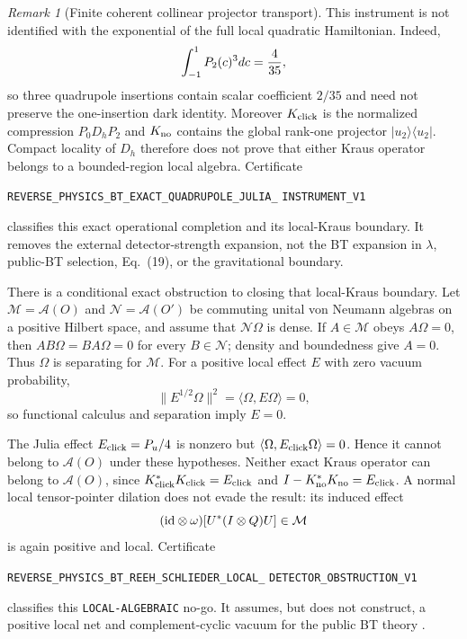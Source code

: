 \documentclass[11pt]{article}
\theoremstyle{definition}
\theoremstyle{remark}
\newtheorem{remark}[theorem]{Remark}
\begin{document}
\begin{remark}[Finite coherent collinear projector transport]
This instrument is not identified with the exponential of the full local
quadratic Hamiltonian.  Indeed,
\[
 \int_{-1}^{1}P_2(c)^3dc={4\over35},
\]
so three quadrupole insertions contain scalar coefficient $2/35$ and need not
preserve the one-insertion dark identity.  Moreover
$K_{\rm click}$ is the normalized compression $P_0D_hP_2$ and
$K_{\rm no}$ contains the global rank-one projector
$|u_2\rangle\langle u_2|$.  Compact locality of $D_h$ therefore does not prove
that either Kraus operator belongs to a bounded-region local algebra.
Certificate
\par\noindent
\texttt{REVERSE\_PHYSICS\_BT\_EXACT\_QUADRUPOLE\_JULIA\_}
\allowbreak\texttt{INSTRUMENT\_V1}
\par\noindent
classifies this exact operational completion and its local-Kraus boundary.
It removes the external detector-strength expansion, not the BT expansion in
$\lambda$, public-BT selection, Eq.~(19), or the gravitational boundary.

There is a conditional exact obstruction to closing that local-Kraus
boundary.  Let $\mathcal M=\mathcal A(O)$ and
$\mathcal N=\mathcal A(O')$ be commuting unital von Neumann algebras on a
positive Hilbert space, and assume that $\mathcal N\Omega$ is dense.  If
$A\in\mathcal M$ obeys $A\Omega=0$, then
$AB\Omega=BA\Omega=0$ for every $B\in\mathcal N$; density and boundedness
give $A=0$.  Thus $\Omega$ is separating for $\mathcal M$.  For a positive
local effect $E$ with zero vacuum probability,
\[
 \|E^{1/2}\Omega\|^2=\langle\Omega,E\Omega\rangle=0,
\]
so functional calculus and separation imply $E=0$.

The Julia effect $E_{\rm click}=P_u/4$ is nonzero but
$\langle\Omega,E_{\rm click}\Omega\rangle=0$.  Hence it cannot belong to
$\mathcal A(O)$ under these hypotheses.  Neither exact Kraus operator can
belong to $\mathcal A(O)$, since
$K_{\rm click}^*K_{\rm click}=E_{\rm click}$ and
$I-K_{\rm no}^*K_{\rm no}=E_{\rm click}$.  A normal local tensor-pointer
dilation does not evade the result: its induced effect
\[
 ({\rm id}\otimes\omega)[U^*(I\otimes Q)U]\in\mathcal M
\]
is again positive and local.  Certificate
\par\noindent
\texttt{REVERSE\_PHYSICS\_BT\_REEH\_SCHLIEDER\_LOCAL\_}
\allowbreak\texttt{DETECTOR\_OBSTRUCTION\_V1}
\par\noindent
classifies this \texttt{LOCAL-ALGEBRAIC} no-go.  It assumes, but does not
construct, a positive local net and complement-cyclic vacuum for the public
BT theory \cite{ReehSchlieder}.


\end{remark}
\end{document}
